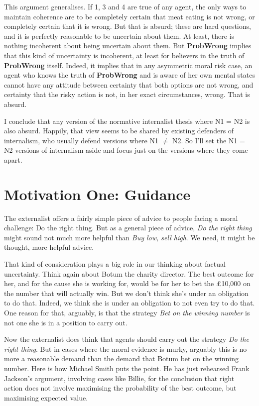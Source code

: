 \documentclass[
  10pt,
  letterpaper,
  twoside]{scrbook}
\begin{document}
This argument generalises. If 1, 3 and 4 are true of any agent, the only
ways to maintain coherence are to be completely certain that meat eating
is not wrong, or completely certain that it is wrong. But that is
absurd; these are hard questions, and it is perfectly reasonable to be
uncertain about them. At least, there is nothing incoherent about being
uncertain about them. But \textbf{ProbWrong} implies that this kind of
uncertainty is incoherent, at least for believers in the truth of
\textbf{ProbWrong} itself. Indeed, it implies that in any asymmetric
moral risk case, an agent who knows the truth of \textbf{ProbWrong} and
is aware of her own mental states cannot have any attitude between
certainty that both options are not wrong, and certainty that the risky
action is not, in her exact circumstances, wrong. That is absurd.

I conclude that any version of the normative internalist thesis where N1
= N2 is also absurd. Happily, that view seems to be shared by existing
defenders of internalism, who usually defend versions where N1 \(\neq\)
N2. So I'll set the N1 = N2 versions of internalism aside and focus just
on the versions where they come apart.

\section{Motivation One: Guidance}\label{motivationone:guidance}

The externalist offers a fairly simple piece of advice to people facing
a moral challenge: Do the right thing. But as a general piece of advice,
\emph{Do the right thing} might sound not much more helpful than
\emph{Buy low, sell high}. We need, it might be thought, more helpful
advice.

That kind of consideration plays a big role in our thinking about
factual uncertainty. Think again about {Botum} the charity director. The
best outcome for her, and for the cause she is working for, would be for
her to bet the £10,000 on the number that will actually win. But we
don't think she's under an obligation to do that. Indeed, we think she
is under an obligation to not even try to do that. One reason for that,
arguably, is that the strategy \emph{Bet on the winning number} is not
one she is in a position to carry out.

Now the externalist does think that agents should carry out the strategy
\emph{Do the right thing}. But in cases where the moral evidence is
murky, arguably this is no more a reasonable demand than the demand that
{Botum} bet on the winning number. Here is how Michael Smith puts the
point. He has just rehearsed {Frank} Jackson's argument, involving cases
like {Billie}, for the conclusion that right action does not involve
maximising the probability of the best outcome, but maximising expected
value.
\end{document}
